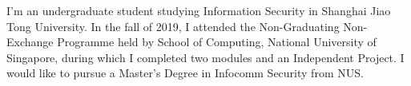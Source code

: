 
I'm an undergraduate student studying Information Security in Shanghai Jiao Tong University.
In the fall of 2019, I attended the Non-Graduating Non-Exchange Programme held by School of Computing, National University of Singapore, during which I completed two modules and an Independent Project.
I would like to pursue a Master's Degree in Infocomm Security from NUS.

